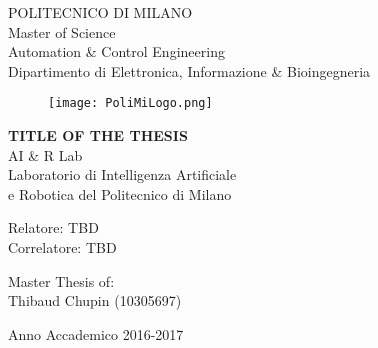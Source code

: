 
\thispagestyle{empty}

\vspace*{-1.5cm} 
\bfseries{
    \begin{center}
        \large
        POLITECNICO DI MILANO\\
        
        \normalsize
        Master of Science \\
        Automation \& Control Engineering \\
        Dipartimento di Elettronica, Informazione \& Bioingegneria\\
        
        \begin{figure}[htbp]
            \begin{center}
                \texttt{[image: PoliMiLogo.png]}    
            \end{center}
        \end{figure}

        \vspace*{0.3cm} \LARGE
        \textbf{TITLE OF THE THESIS}\\

        \vspace*{.75truecm} \large
        AI \& R Lab \\
        Laboratorio di Intelligenza Artificiale \\
    e Robotica del Politecnico di Milano
    \end{center}

    \vspace*{3.0cm} \large
    \begin{flushleft}
        Relatore: TBD \\
        Correlatore: TBD 
    \end{flushleft}

    \vspace*{1.0cm}
    \begin{flushright}
        Master Thesis of:\\ 
        Thibaud Chupin (10305697) \\ 
    \end{flushright}

    \vspace*{0.5cm}
    \begin{center}
        Anno Accademico 2016-2017
    \end{center} 

    \clearpage
}
